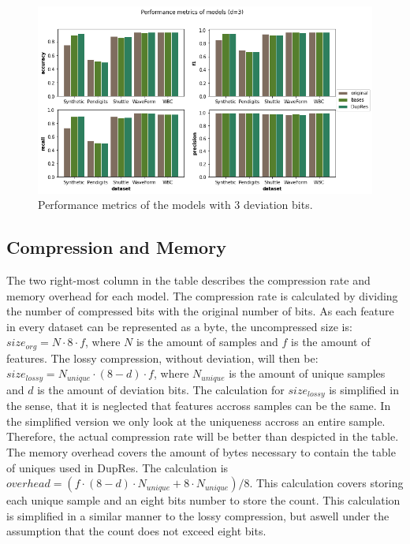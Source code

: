 \begin{figure}
  \centering
  \includegraphics[width=\linewidth]{images/performance_metrics.png}
  \caption{Performance metrics of the models with 3 deviation bits. }
  \label{fig:performance_metrics}
\end{figure}
\subsection{Compression and Memory}
The two right-most column in the table describes the compression rate and memory overhead for each model. The compression rate is calculated by dividing the number of compressed bits with the original number of bits. As each feature in every dataset can be represented as a byte, the uncompressed size is: $size_{org} = N \cdot 8 \cdot f $, where $N$ is the amount of samples and $f$ is the amount of features. The lossy compression, without deviation, will then be: $size_{lossy}=N_{unique} \cdot (8-d) \cdot f$, where $N_{unique}$ is the amount of unique samples and $d$ is the amount of deviation bits. The calculation for $size_{lossy}$ is simplified in the sense, that it is neglected that features accross samples can be the same. In the simplified version we only look at the uniqueness accross an entire sample. Therefore, the actual compression rate will be better than despicted in the table. The memory overhead covers the amount of bytes necessary to contain the table of uniques used in DupRes. The calculation is $overhead = (f \cdot (8-d) \cdot N_{unique} + 8 \cdot N_{unique})/8$. This calculation covers storing each unique sample and an eight bits number to store the count. This calculation is simplified in a similar manner to the lossy compression, but aswell under the assumption that the count does not exceed eight bits.          

